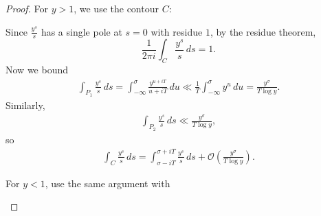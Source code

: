 \documentclass{article}
\newcommand{\1}{\mathbbm{1}}
\newcommand{\bigO}{\mathcal{O}}
\begin{document}
\begin{proof}
\newlec
  For $y > 1$, we use the contour $C$:
  \begin{center}
  \end{center}
  Since $\frac{y^s}{s}$ has a single pole at $s=0$ with residue $1$, by the residue theorem,
  \begin{equation*}
    \frac{1}{2 \pi i} \int_C \frac{y^s}{s}\,ds=1.
  \end{equation*}
  Now we bound
  \begin{align*}
    \int_{P_1} \frac{y^s}{s} \,ds = \int_{-\infty}^\sigma \frac{y^{u+iT}}{u+iT}\,du \ll \frac{1}{T} \int_{-\infty}^\sigma y^u\,du = \frac{y^\sigma}{T \log y}.
  \end{align*}
  Similarly,
  \begin{align*}
    \int_{P_2} \frac{y^s}{s}\,ds \ll \frac{y^\sigma}{T \log y},
  \end{align*}
  so
  \begin{align*}
    \int_C \frac{y^s}{s} \,ds = \int_{\sigma-iT}^{\sigma+iT} \frac{y^s}{s}\,ds + \bigO\left(\frac{y^\sigma}{T \log y}\right).
  \end{align*}

  For $y < 1$, use the same argument with
  \begin{center}
  \end{center}
\end{proof}
\end{document}
